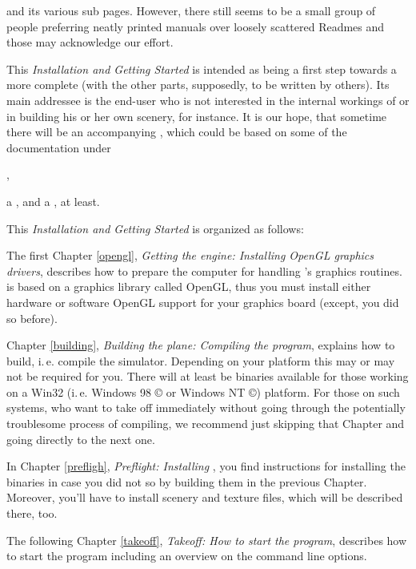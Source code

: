 
 \noindent
 and its various sub pages. However, there still seems to
be a small group of people preferring neatly printed manuals over
loosely scattered Readmes and those may acknowledge our effort.

This \textit{Installation and Getting Started} is intended as being a first step towards
a more complete  (with the other parts, supposedly, to
be written by others). Its main addressee is the end-user who is not interested in the
internal workings of  or in building his or her own scenery, for instance.
It is our hope, that sometime there will be an accompanying \textit{}, which could be based on some of the documentation under

,

 \noindent
a \textit{}, and a
\textit{}, at least.

This \textit{Installation and Getting Started} is organized as
follows:

The first Chapter \ref{opengl}, \textit{Getting the engine: Installing OpenGL graphics
drivers}, describes how to prepare the computer for handling \FlightGear's graphics
routines. \FlightGear is based on a graphics library called OpenGL, thus you must install
either hardware or software OpenGL support for your graphics board (except, you did so
before).

Chapter \ref{building}, \textit{Building the plane: Compiling the program}, explains how
to build, i.\,e. compile the simulator. Depending on your platform this may or may not be
required for you. There will at least be binaries available for those working on a Win32
(i.\,e. Windows 98 {\copyright} or Windows NT {\copyright}) platform. For those on such
systems, who want to take off immediately without going through the potentially
troublesome process of compiling, we recommend just skipping that Chapter and going
directly to the next one.

In Chapter \ref{prefligh}, \textit{Preflight: Installing \FlightGear}, you find
instructions for installing the binaries in case you did not so by building them in the
previous Chapter. Moreover, you'll have to install scenery and texture files, which will
be described there, too.

The following Chapter \ref{takeoff}, \textit{Takeoff: How to start the program},
describes how to start the program including an overview on the command line options.

